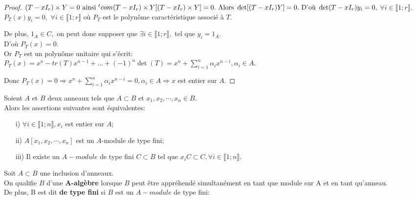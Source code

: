 \begin{proof}
	$(T-xI_{r})\times Y=0 \text{ ainsi } {^{t}com}(T-xI_{r})\times Y[(T-xI_{r})\times Y]=0. \\ 
	\text{ Alors } \det [(T-xI_{r})Y]=0. \\
	\text{ D'où } \det(T-xI_{r})y_{i}=0,$ $\forall i\in \llbracket 1; r \rrbracket $. 
	\\$P_{T}(x)y_{i}=0,$ $\forall i\in \llbracket 1; r \rrbracket
	$ où $P_{T}$ est le polynôme caractéristique associé à $T.$
	
	De plus, $1_A\in C,$ on peut donc supposer que $\exists i\in \llbracket 1; r \rrbracket ,$ tel que $y_{i}=1_A.$\\
	D'où $P_{T}(x)=0.$\\
	Or $P_{T}$ est un polynôme unitaire qui s'écrit:\\ $P_{T}(x)=x^{n}-tr(T)x^{n-1}+...+(-1)^{n}\det
	(T)=x^{n}+\sum\limits_{i=1}^{n}\alpha _{i}x^{n-i},\alpha _{i}\in A.$
	
	Donc $P_{T}(x)=0\Rightarrow x^{n}+\sum\limits_{i=1}^{n}\alpha
	_{i}x^{n-i}=0,\alpha _{i}\in A\Rightarrow x$ est entier sur $A.$
	
\end{proof}
\begin{moncorollaire}
	Soient $A$ et $B$ deux anneaux tels que $A \subset  B$ et $x_1, x_2, \cdots, x_n \in B$.\\
	Alors les assertions suivantes sont équivalentes:
	\begin{enumerate}
		\item[i)]$\forall i \in \llbracket 1; n \rrbracket, x_i$ est entier sur $A$;
		\item[ii)]$A[x_1, x_2, \cdots, x_n]$ est un $A$-module de type fini;
		\item[iii)]Il existe un $A-module$ de type fini $C \subset  B$ tel que $x_i C \subset  C, \forall i \in \llbracket 1; n \rrbracket$.
	\end{enumerate}
\end{moncorollaire}

\begin{madefinition}
	Soit $A \subset B$ une inclusion d'anneaux.\\
	On qualifie $B$ d'une \textbf{A-algèbre} lorsque $B$ peut être appréhendé simultanément en tant que module sur A et en tant qu'anneau.\\
	De plus, B est dit \textbf{de type fini} si $B$ est un $A-module$ de type fini:
\end{madefinition}

